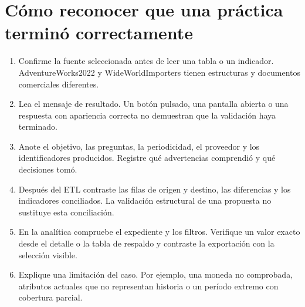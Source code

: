 \section{Cómo reconocer que una práctica terminó correctamente}
\begin{enumerate}
\item Confirme la fuente seleccionada antes de leer una tabla o un indicador. AdventureWorks2022 y WideWorldImporters tienen estructuras y documentos comerciales diferentes.
\item Lea el mensaje de resultado. Un botón pulsado, una pantalla abierta o una respuesta con apariencia correcta no demuestran que la validación haya terminado.
\item Anote el objetivo, las preguntas, la periodicidad, el proveedor y los identificadores producidos. Registre qué advertencias comprendió y qué decisiones tomó.
\item Después del ETL contraste las filas de origen y destino, las diferencias y los indicadores conciliados. La validación estructural de una propuesta no sustituye esta conciliación.
\item En la analítica compruebe el expediente y los filtros. Verifique un valor exacto desde el detalle o la tabla de respaldo y contraste la exportación con la selección visible.
\item Explique una limitación del caso. Por ejemplo, una moneda no comprobada, atributos actuales que no representan historia o un período extremo con cobertura parcial.
\end{enumerate}


